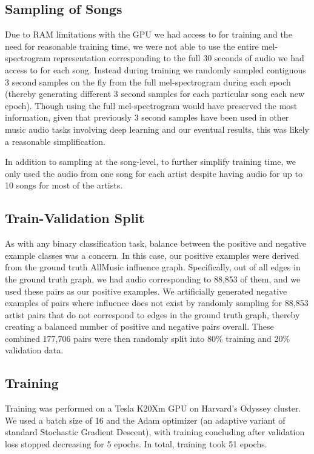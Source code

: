 \subsection{Sampling of Songs}
Due to RAM limitations with the GPU we had access to for training and the need for reasonable training time, we were not able to use the entire mel-spectrogram representation corresponding to the full 30 seconds of audio we had access to for each song. Instead during training we randomly sampled contiguous 3 second samples on the fly from the full mel-spectrogram during each epoch (thereby generating different 3 second samples for each particular song each new epoch). Though using the full mel-spectrogram would have preserved the most information, given that previously \cite{van2013deep} 3 second samples have been used in other music audio tasks involving deep learning and our eventual results, this was likely a reasonable simplification.

In addition to sampling at the song-level, to further simplify training time, we only used the audio from one song for each artist despite having audio for up to 10 songs for most of the artists.

\subsection{Train-Validation Split}
As with any binary classification task, balance between the positive and negative example classes was a concern. In this case, our positive examples were derived from the ground truth AllMusic influence graph. Specifically, out of all edges in the ground truth graph, we had audio corresponding to 88,853 of them, and we used these pairs as our positive examples. We artificially generated negative examples of pairs where influence does not exist by randomly sampling for 88,853 artist pairs that do not correspond to edges in the ground truth graph, thereby creating a balanced number of positive and negative pairs overall. These combined 177,706 pairs were then randomly split into 80\% training and 20\% validation data. 

\subsection{Training}
Training was performed on a Tesla K20Xm GPU on Harvard's Odyssey cluster. We used a batch size of 16 and the Adam optimizer \cite{kingma2014adam} (an adaptive variant of standard Stochastic Gradient Descent), with training concluding after validation loss stopped decreasing for 5 epochs. In total, training took 51 epochs. 

